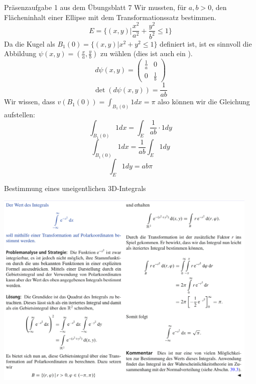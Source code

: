 \begin{Beispiel}{Präsenzaufgabe 1 aus dem Übungsblatt 7}
    Wir mussten, für $a,b>0$, den Flächeninhalt einer Ellipse mit dem Transformationssatz bestimmen.
    $$E=\{(x,y)| \frac{x^2}{a^2}+\frac{y^2}{b^2} \leq 1\}$$
    Da die Kugel als $B_1(0)=\{(x,y)| x^2+y^2 \leq 1\}$ definiert ist, ist es sinnvoll die Abbildung $\psi(x,y)=(\frac{x}{a}, \frac{y}{b})$ zu wählen (dies ist auch ein ).
    $$d\psi(x,y)=\begin{pmatrix}
        \frac{1}{a} & 0 \\
        0 & \frac{1}{b}
    \end{pmatrix}$$
    $$\det(d\psi(x,y))=\frac{1}{ab}$$
    Wir wissen, dass $v(B_1(0))=\int_{B_1(0)} 1dx = \pi$ also können wir die Gleichung aufstellen:
    $$\int_{B_1(0)}1 dx = \int_E \frac{1}{ab}\cdot 1 dy$$
    $$\int_{B_1(0)}1 dx = \frac{1}{ab}\int_E 1 dy$$
    $$\int_E 1 dy = ab\pi$$
\end{Beispiel}
\begin{Beispiel}{Bestimmung eines uneigentlichen 3D-Integrals}
    \begin{center}
    \includegraphics[width=0.95\textwidth]{Dateien/Uneigentlich_e_hoch_x_quadrat.png}

\end{center}
\end{Beispiel}
